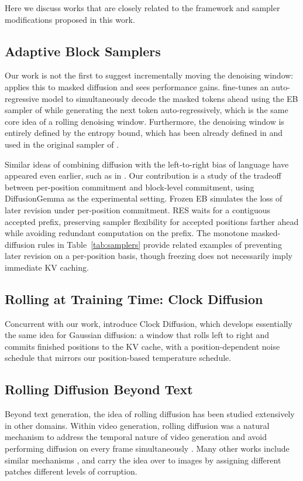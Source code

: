 Here we discuss works that are closely related to the framework and sampler modifications proposed in this work.

\subsection{Adaptive Block Samplers}
Our work is not the first to suggest incrementally moving the denoising window: \citet{luo2026dsb} applies this to masked diffusion and sees performance gains.
\citet{gat2025set} fine-tunes an auto-regressive model to simultaneously decode the masked tokens ahead using the EB sampler of \citet{ben2026accelerated} while generating the next token auto-regressively, which is the same core idea of a rolling denoising window.
Furthermore, the denoising window is entirely defined by the entropy bound, which has been already defined in \citet{ben2026accelerated} and used in the original sampler of \citet{team2026diffusiongemma}.

Similar ideas of combining diffusion with the left-to-right bias of language have appeared even earlier, such as in \citep{wu2023ar}.
Our contribution is a study of the tradeoff between per-position commitment and block-level commitment, using DiffusionGemma as the experimental setting. Frozen EB simulates the loss of later revision under per-position commitment. RES waits for a contiguous accepted prefix, preserving sampler flexibility for accepted positions farther ahead while avoiding redundant computation on the prefix. The monotone masked-diffusion rules in Table~\ref{tab:samplers} provide related examples of preventing later revision on a per-position basis, though freezing does not necessarily imply immediate KV caching.

\subsection{Rolling at Training Time: Clock Diffusion}
Concurrent with our work, \citet{schiff2026clock} introduce Clock Diffusion, which develops essentially the same idea for Gaussian diffusion: a window that rolls left to right and commits finished positions to the KV cache, with a position-dependent noise schedule that mirrors our position-based temperature schedule.

\subsection{Rolling Diffusion Beyond Text}
Beyond text generation, the idea of rolling diffusion has been studied extensively in other domains.
Within video generation, rolling diffusion was a natural mechanism to address the temporal nature of video generation and avoid performing diffusion on every frame simultaneously \citep{ruhe2024rolling}.
Many other works include similar mechanisms \citep{chen2024diffusion, song2025history, xie2025progressive}, and \citet{papa2026asyncpatch} carry the idea over to images by assigning different patches different levels of corruption.
